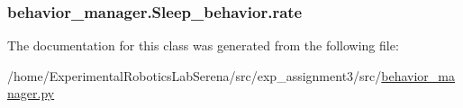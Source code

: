 \subsubsection[{\texorpdfstring{rate}{rate}}]{\setlength{\rightskip}{0pt plus 5cm}behavior\+\_\+manager.\+Sleep\+\_\+behavior.\+rate}\hypertarget{classbehavior__manager_1_1Sleep__behavior_a75cca73975838d3ee66cc687726685de}{}\label{classbehavior__manager_1_1Sleep__behavior_a75cca73975838d3ee66cc687726685de}


The documentation for this class was generated from the following file\+:\begin{DoxyCompactItemize}
\item 
/home/\+Experimental\+Robotics\+Lab\+Serena/src/exp\+\_\+assignment3/src/\hyperlink{behavior__manager_8py}{behavior\+\_\+manager.\+py}\end{DoxyCompactItemize}
